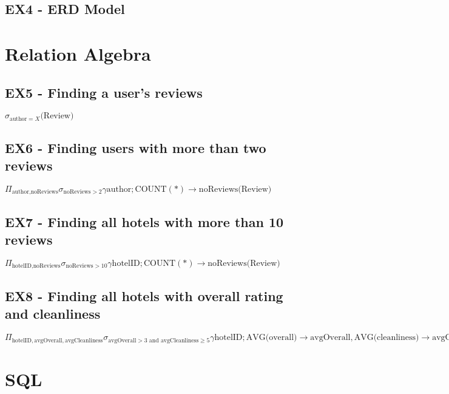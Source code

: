 \documentclass[a4paper]{article}
\begin{document}
\subsection{EX4 - ERD Model}
\begin{center}
\def\svgwidth{0.4 \columnwidth}

\end{center}

\section{Relation Algebra}
\subsection{EX5 - Finding a user's reviews}
$\sigma_{\textrm{author}=X} \textrm{(Review)}$
\subsection{EX6 - Finding users with more than two reviews}
$\Pi_{\textrm{author}, \textrm{noReviews}}\sigma_{\textrm{noReviews} > 2} \gamma \textrm{author}; \textrm{COUNT}(*) \to \textrm{noReviews} \textrm{(Review)}$
\subsection{EX7 - Finding all hotels with more than 10 reviews}
$\Pi_{\textrm{hotelID}, \textrm{noReviews}}\sigma_{\textrm{noReviews} > 10} \gamma \textrm{hotelID}; \textrm{COUNT}(*) \to \textrm{noReviews} \textrm{(Review)}$
\subsection{EX8 - Finding all hotels with overall rating and cleanliness}
$\Pi_{\textrm{hotelID}, \textrm{avgOverall}, \textrm{avgCleanliness}}\sigma_{\textrm{avgOverall} > 3 \textrm{ and } \textrm{avgCleanliness} \geq 5} \gamma \textrm{hotelID}; \textrm{AVG(overall)} \to \textrm{avgOverall},  \textrm{AVG(cleanliness)} \to \textrm{avgCleanliness} \textrm{(Review)}$

\section{SQL}
\end{document}
